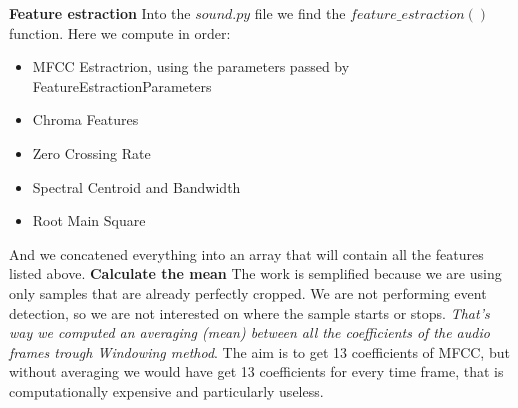 \documentclass{article}
\begin{document}
\textbf{Feature estraction}
Into the $sound.py$ file we find the $feature\_estraction()$ function. Here we compute in order:
\begin{itemize}
\item MFCC Estractrion, using the parameters passed by FeatureEstractionParameters
\item Chroma Features
\item Zero Crossing Rate
\item Spectral Centroid and Bandwidth
\item Root Main Square 
\end{itemize}
And we concatened everything into an array that will contain all the features listed above.
\newline
\newline
\textbf{Calculate the mean}
The work is semplified because we are using only samples that are already perfectly cropped. We are not performing event detection, so we are not interested on where the sample starts or stops. \emph{That's way we computed an averaging (mean) between all the coefficients of the audio frames trough Windowing method}. The aim is to get 13 coefficients of MFCC, but without averaging we would have get 13 coefficients for every time frame, that is computationally expensive and particularly useless.
\end{document}
